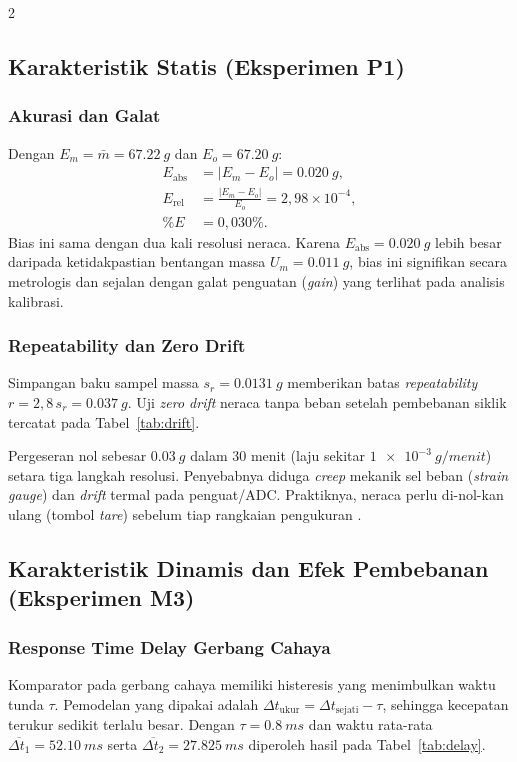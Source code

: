 \documentclass[a4paper, 12pt]{article}
\begin{document}
\begin{multicols}{2}
    \raggedcolumns
        \subsection{Karakteristik Statis (Eksperimen P1)}
            \subsubsection{Akurasi dan Galat}
            Dengan $E_m=\bar{m}=\SI{67,22}{g}$ dan $E_o=\SI{67,20}{g}$:
            \begin{align}
                E_{\mathrm{abs}} &= |E_m-E_o|=\SI{0,020}{g},\\
                E_{\mathrm{rel}} &= \frac{|E_m-E_o|}{E_o}=2{,}98\times10^{-4},\\
                \%E &= 0{,}030\%.
            \end{align}
            Bias ini sama dengan dua kali resolusi neraca. Karena $E_{\mathrm{abs}}=\SI{0,020}{g}$ lebih besar daripada ketidakpastian bentangan massa $U_m=\SI{0,011}{g}$, bias ini signifikan secara metrologis dan sejalan dengan galat penguatan (\textit{gain}) yang terlihat pada analisis kalibrasi.

            \subsubsection{Repeatability dan Zero Drift}
            Simpangan baku sampel massa $s_r=\SI{0,0131}{g}$ memberikan batas \textit{repeatability} $r=2{,}8\,s_r=\SI{0,037}{g}$. Uji \textit{zero drift} neraca tanpa beban setelah pembebanan siklik tercatat pada Tabel~\ref{tab:drift}.

            Pergeseran nol sebesar $\SI{0,03}{g}$ dalam $30$ menit (laju sekitar $\SI{1e-3}{g/menit}$) setara tiga langkah resolusi. Penyebabnya diduga \textit{creep} mekanik sel beban (\textit{strain gauge}) dan \textit{drift} termal pada penguat/ADC. Praktiknya, neraca perlu di-nol-kan ulang (tombol \textit{tare}) sebelum tiap rangkaian pengukuran \parencite{MorrisLangari}.

        \subsection{Karakteristik Dinamis dan Efek Pembebanan (Eksperimen M3)}
            \subsubsection{Response Time Delay Gerbang Cahaya}
            Komparator pada gerbang cahaya memiliki histeresis yang menimbulkan waktu tunda $\tau$. Pemodelan yang dipakai adalah $\Delta t_{\mathrm{ukur}}=\Delta t_{\mathrm{sejati}}-\tau$, sehingga kecepatan terukur sedikit terlalu besar. Dengan $\tau=\SI{0,8}{ms}$ dan waktu rata-rata $\overline{\Delta t_1}=\SI{52,10}{ms}$ serta $\overline{\Delta t_2}=\SI{27,825}{ms}$ diperoleh hasil pada Tabel~\ref{tab:delay}.


\end{multicols}
\end{document}
